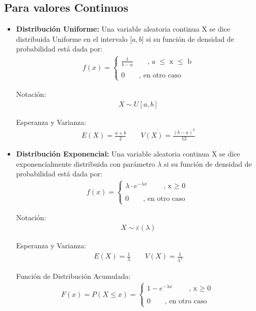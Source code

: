 \documentclass{templateNote}
\begin{document}
\subsection*{Para valores Continuos}
\begin{itemize}
  \item \textbf{Distribución Uniforme:} Una variable aleatoria continua X se dice distribuida Uniforme en el intervalo [$a, b$] si su función
  de densidad de probabilidad está dada por:
  \begin{align*}
    f(x) =
    \begin{cases}
      \displaystyle \frac{1}{b-a} \qquad \text{, a $\leq$ x $\leq$ b} \\
      \\
      0 \qquad \text{, en otro caso}
    \end{cases}
  \end{align*}

  Notación:
  \begin{align*}
    X \sim U[a, b]
  \end{align*}

  Esperanza y Varianza:
  \begin{align*}
    E(X) = \frac{a+b}{2} \qquad V(X) = \frac{(b-a)^2}{12}
  \end{align*}

  \newpage
  \item \textbf{Distribución Exponencial:} Una variable aleatoria continua X se dice exponencialmente distribuida con parámetro $\lambda$ si su
  función de densidad de probabilidad está dada por:
  \begin{align*}
    f(x) =
    \begin{cases}
      \displaystyle \lambda \cdot e^{-\lambda x} \qquad \text{, x $\geq$ 0} \\
      \\
      0 \qquad \text{, en otro caso}
    \end{cases}
  \end{align*}

  Notación:
  \begin{align*}
    X \sim \varepsilon(\lambda)
  \end{align*}

  Esperanza y Varianza:
  \begin{align*}
    E(X) = \frac{1}{\lambda} \qquad V(X) = \frac{1}{\lambda^2}
  \end{align*}

  Función de Distribución Acumulada:
  \begin{align*}
    F(x) = P(X \leq x) =
    \begin{cases}
      \displaystyle 1 - e^{-\lambda x} \qquad \text{, x $\geq$ 0} \\
      \\
      0 \qquad \text{, en otro caso}
    \end{cases}
  \end{align*}


\end{itemize}
\end{document}
